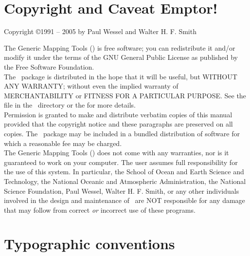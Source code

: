 
\chapter*{Copyright and Caveat Emptor!}

\begin{center}
Copyright \copyright 1991 -- 2005 by Paul Wessel and Walter H. F. Smith
\end{center}

\vspace{\baselineskip}

The Generic Mapping Tools (\GMT) is free software; you can redistribute
it and/or modify it under the terms of the GNU General Public License
as published by the Free Software Foundation. \\

The \GMT\ package is distributed in the hope that it will be useful, but
WITHOUT ANY WARRANTY; without even the implied warranty of
MERCHANTABILITY or FITNESS FOR A PARTICULAR PURPOSE.  See the
file  in the \GMT\ directory or the
for more details. \\

Permission is granted to make and distribute verbatim copies of this
manual provided that the copyright notice and these paragraphs are
preserved on all copies.  The \GMT\ package may be included in a bundled
distribution of software for which a reasonable fee may be charged. \\

The Generic Mapping Tools (\GMT) does not come with any warranties,
nor is it guaranteed to work on your computer.  The user assumes full
responsibility for the use of this system. In particular, the School of
Ocean and Earth Science and Technology, the National Oceanic and
Atmospheric Administration, the National Science Foundation,
Paul Wessel, Walter H. F. Smith, or any other individuals involved in
the design and maintenance of \GMT\ are NOT responsible for any damage
that may follow from correct \emph{or} incorrect use of these programs.


\chapter*{Typographic conventions}

